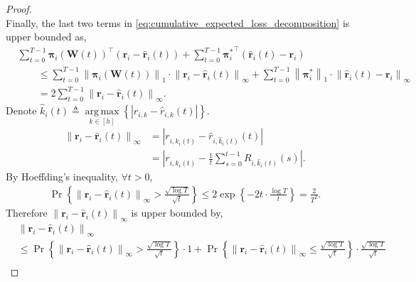 \documentclass[10pt]{article}
\def\rvr{{\mathbf{r}}}
\def\rvpi{{\boldsymbol{\pi}}}
\def\rmW{{\mathbf{W}}}
\DeclareMathOperator*{\argmax}{arg\,max}
\DeclareMathOperator*{\probability}{Pr}
\begin{document}
\begin{proof}
\begin{equation}
\end{equation}
Finally, the last two terms in \cref{eq:cumulative_expected_loss_decomposition} is upper bounded as,
\begin{equation}
\label{eq:last_two_terms_upper_bound}
\begin{split}
    &\sum\limits_{t=0}^{T-1}{ \rvpi_i\left(\rmW(t)\right)^\top \left( \rvr_i - \hat{\rvr}_i(t) \right) } + \sum\limits_{t=0}^{T-1}{ {\rvpi_i^*}^\top \left( \hat{\rvr}_i(t) - \rvr_i \right) } \\
    &\qquad \le \sum\limits_{t=0}^{T-1}{ \left\| \rvpi_i\left(\rmW(t)\right)\right\|_1 \cdot \left\| \rvr_i - \hat{\rvr}_i(t) \right\|_\infty } + \sum\limits_{t=0}^{T-1}{ \left\| {\rvpi_i^*} \right\|_1 \cdot \left\| \hat{\rvr}_i(t) - \rvr_i \right\|_\infty } \\
    &\qquad = 2 \sum\limits_{t=0}^{T-1}{ \left\| \rvr_i - \hat{\rvr}_i(t) \right\|_\infty }.
\end{split}
\end{equation}
Denote $\hat{k}_i(t) \triangleq \argmax\limits_{k \in [h]}{ \left\{ \left| r_{i,k} - \hat{r}_{i,k}(t) \right| \right\}}$.
\begin{equation*}
\begin{split}
    \left\| \rvr_i - \hat{\rvr}_i(t) \right\|_\infty &= \left| r_{i, \hat{k}_i(t)} - \hat{r}_{i,\hat{k}_i(t)}(t) \right| \\
    &= \left| r_{i, \hat{k}_i(t)} - \frac{1}{t} \sum\limits_{s=0}^{t-1}{R_{i, \hat{k}_i(t)}(s)} \right|.
\end{split}
\end{equation*}
By Hoeffding's inequality, $\forall t > 0$,
\begin{equation*}
\begin{split}
    \probability{\left\{ \left\| \rvr_i - \hat{\rvr}_i(t) \right\|_\infty > \frac{\sqrt{\log{T}}}{\sqrt{t}} \right\}} \le 2 \exp{\left\{ - 2 t \cdot \frac{\log{T}}{t}\right\}} = \frac{2}{T^2}.
\end{split}
\end{equation*}
Therefore $\left\| \rvr_i - \hat{\rvr}_i(t) \right\|_\infty$ is upper bounded by,
\begin{equation}
\label{eq:empirical_estimation_upper_bound}
\begin{split}
    &\left\| \rvr_i - \hat{\rvr}_i(t) \right\|_\infty \\
    & \le \probability{\left\{ \left\| \rvr_i - \hat{\rvr}_i(t) \right\|_\infty > \frac{\sqrt{\log{T}}}{\sqrt{t}} \right\}} \cdot 1 + \probability{\left\{ \left\| \rvr_i - \hat{\rvr}_i(t) \right\|_\infty \le \frac{\sqrt{\log{T}}}{\sqrt{t}} \right\}} \cdot \frac{\sqrt{\log{T}}}{\sqrt{t}} \\

\end{split}
\end{equation}
\end{proof}
\end{document}
